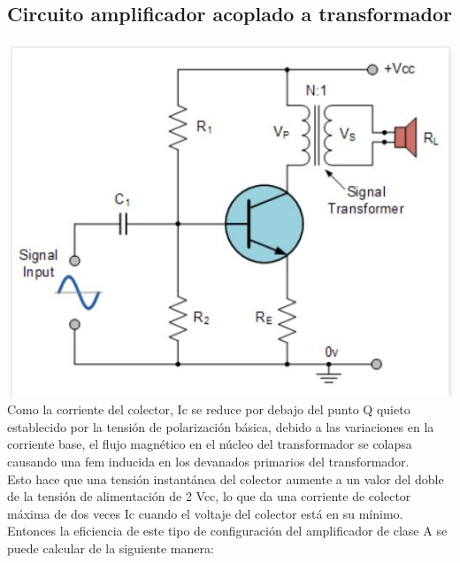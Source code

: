 \documentclass[12pt,a4paper]{article}
\begin{document}
\begin{flushleft}
\subsection{Circuito amplificador acoplado a transformador}
\includegraphics[scale=1]{imagenes/c2.JPG} \\
Como la corriente del colector, Ic se reduce por debajo del punto Q quieto establecido por la tensión de polarización básica, debido a las variaciones en la corriente base, el flujo magnético en el núcleo del transformador se colapsa causando una fem inducida en los devanados primarios del transformador. \\
Esto hace que una tensión instantánea del colector aumente a un valor del doble de la tensión de alimentación de 2 Vcc, lo que da una corriente de colector máxima de dos veces Ic cuando el voltaje del colector está en su mínimo. Entonces la eficiencia de este tipo de configuración del amplificador de clase A se puede calcular de la siguiente manera: \\
\end{flushleft}
\end{document}
